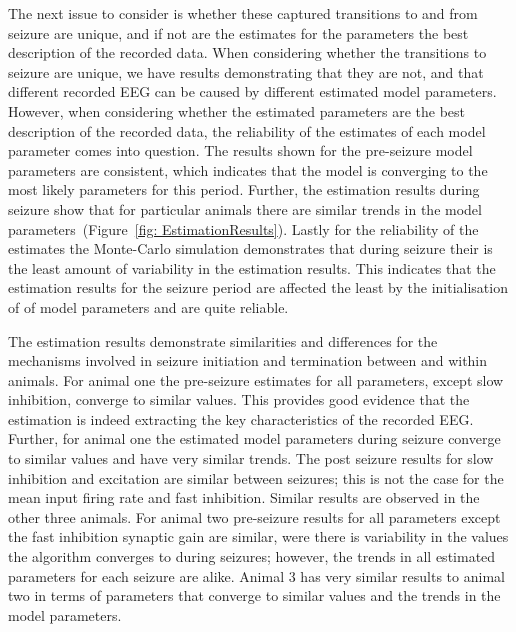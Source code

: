 The next issue to consider is whether these captured transitions to and from seizure are unique, and if not are the estimates for the parameters the best description of the recorded data. When considering whether the transitions to seizure are unique, we have results demonstrating that they are not, and that different recorded EEG can be caused by different estimated model parameters. However, when considering whether the estimated parameters are the best description of the recorded data, the reliability of the estimates of each model parameter comes into question. The results shown for the pre-seizure model parameters are consistent, which indicates that the model is converging to the most likely parameters for this period. Further, the estimation results during seizure show that for particular animals there are similar trends in the model parameters~(Figure~\ref{fig: EstimationResults}). Lastly for the reliability of the estimates the Monte-Carlo simulation demonstrates that during seizure their is the least amount of variability in the estimation results. This indicates that the estimation results for the seizure period are affected the least by the initialisation of of model parameters and are quite reliable. 


The estimation results demonstrate similarities and differences for the mechanisms involved in seizure initiation and termination between and within animals. For animal one the pre-seizure estimates for all parameters, except slow inhibition, converge to similar values. This provides good evidence that the estimation is indeed extracting the key characteristics of the recorded EEG. Further, for animal one the estimated model parameters during seizure converge to similar values and have very similar trends. The post seizure results for slow inhibition and excitation are similar between seizures; this is not the case for the mean input firing rate and fast inhibition. Similar results are observed in the other three animals. For animal two pre-seizure results for all parameters except the fast inhibition synaptic gain are similar, were there is variability in the values the algorithm converges to during seizures; however, the trends in all estimated parameters for each seizure are alike. Animal 3 has very similar results to animal two in terms of parameters that converge to similar values and the trends in the model parameters.


